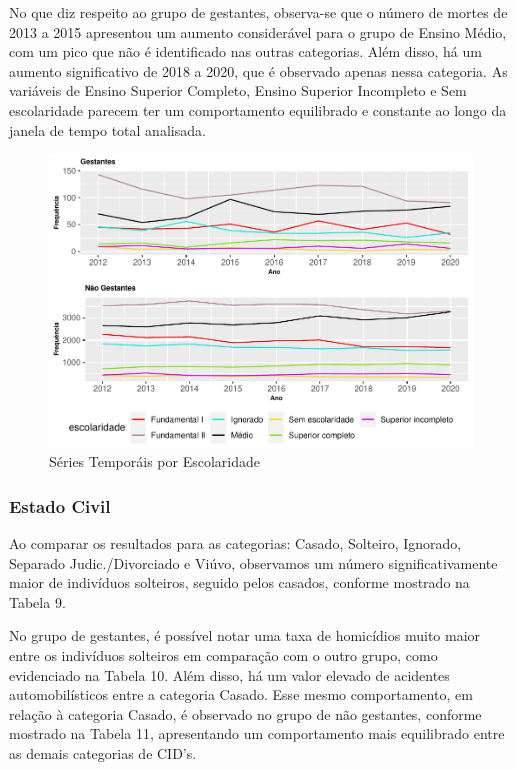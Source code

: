 \documentclass[
]{article}
\begin{document}
No que diz respeito ao grupo de gestantes, observa-se que o número de
mortes de 2013 a 2015 apresentou um aumento considerável para o grupo de
Ensino Médio, com um pico que não é identificado nas outras categorias.
Além disso, há um aumento significativo de 2018 a 2020, que é observado
apenas nessa categoria. As variáveis de Ensino Superior Completo, Ensino
Superior Incompleto e Sem escolaridade parecem ter um comportamento
equilibrado e constante ao longo da janela de tempo total analisada.

\begin{figure}
\centering
\includegraphics{RelatorioV01_files/figure-latex/unnamed-chunk-8-1.pdf}
\caption{Séries Temporáis por Escolaridade}
\end{figure}

\hypertarget{estado-civil}{%
\subsubsection{Estado Civil}\label{estado-civil}}

Ao comparar os resultados para as categorias: Casado, Solteiro,
Ignorado, Separado Judic./Divorciado e Viúvo, observamos um número
significativamente maior de indivíduos solteiros, seguido pelos casados,
conforme mostrado na Tabela 9.

No grupo de gestantes, é possível notar uma taxa de homicídios muito
maior entre os indivíduos solteiros em comparação com o outro grupo,
como evidenciado na Tabela 10. Além disso, há um valor elevado de
acidentes automobilísticos entre a categoria Casado. Esse mesmo
comportamento, em relação à categoria Casado, é observado no grupo de
não gestantes, conforme mostrado na Tabela 11, apresentando um
comportamento mais equilibrado entre as demais categorias de CID's.
\end{document}
